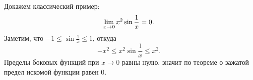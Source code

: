 \begin{example}
Докажем классический пример:
\[
    \lim\limits_{x \to 0} x^2\sin\frac{1}{x} = 0.
\]
Заметим, что $-1\le \sin\frac{1}{x}\le 1$, откуда
\[
    -x^2 \le x^2\sin\frac{1}{x} \le x^2.
\]
Пределы боковых функций при $x\to0$ равны нулю, значит по теореме о зажатой предел искомой функции равен $0$.
\end{example}
